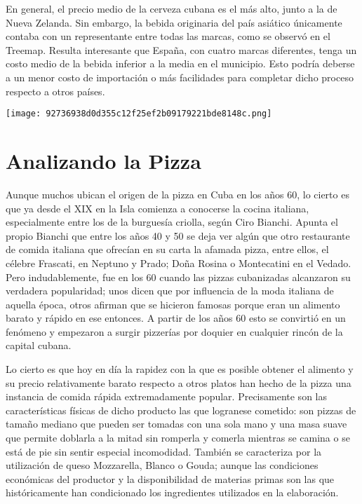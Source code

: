 En general, el precio medio de la cerveza cubana es el más alto, junto a
la de Nueva Zelanda. Sin embargo, la bebida originaria del país asiático
únicamente contaba con un representante entre todas las marcas, como se
observó en el Treemap. Resulta interesante que España, con cuatro marcas
diferentes, tenga un costo medio de la bebida inferior a la media en el
municipio. Esto podría deberse a un menor costo de importación o más
facilidades para completar dicho proceso respecto a otros países.


\texttt{[image: 92736938d0d355c12f25ef2b09179221bde8148c.png]}

\hypertarget{analizando-la-pizza}{%
\section{Analizando la Pizza}\label{analizando-la-pizza}}

Aunque muchos ubican el origen de la pizza en Cuba en los años 60, lo
cierto es que ya desde el XIX en la Isla comienza a conocerse la cocina
italiana, especialmente entre los de la burguesía criolla, según Ciro
Bianchi. Apunta el propio Bianchi que entre los años 40 y 50 se deja ver
algún que otro restaurante de comida italiana que ofrecían en su carta
la afamada pizza, entre ellos, el célebre Frascati, en Neptuno y Prado;
Doña Rosina o Montecatini en el Vedado. Pero indudablemente, fue en los
60 cuando las pizzas cubanizadas alcanzaron su verdadera popularidad;
unos dicen que por influencia de la moda italiana de aquella época,
otros afirman que se hicieron famosas porque eran un alimento barato y
rápido en ese entonces. A partir de los años 60 esto se convirtió en un
fenómeno y empezaron a surgir pizzerías por doquier en cualquier rincón
de la capital cubana.

Lo cierto es que hoy en día la rapidez con la que es posible obtener el
alimento y su precio relativamente barato respecto a otros platos han
hecho de la pizza una instancia de comida rápida extremadamente popular.
Precisamente son las características físicas de dicho producto las que
logranese cometido: son pizzas de tamaño mediano que pueden ser tomadas
con una sola mano y una masa suave que permite doblarla a la mitad sin
romperla y comerla mientras se camina o se está de pie sin sentir
especial incomodidad. También se caracteriza por la utilización de queso
Mozzarella, Blanco o Gouda; aunque las condiciones económicas del
productor y la disponibilidad de materias primas son las que
históricamente han condicionado los ingredientes utilizados en la
elaboración.

